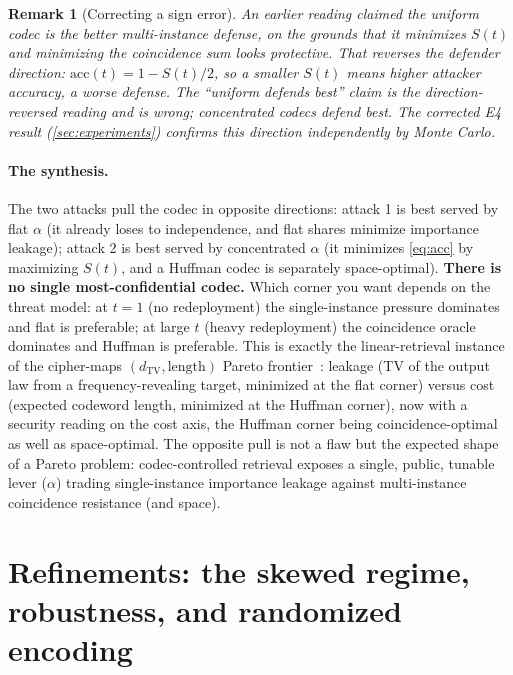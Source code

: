 \documentclass[sigconf,nonacm,anonymous,balance=false]{acmart}
\newtheorem{remark}{Remark}
\newcommand{\TV}{d_{\mathrm{TV}}}
\newcommand{\al}{\alpha}                    %
\begin{document}
\begin{remark}[Correcting a sign error]
\label{rem:sign}
An earlier reading claimed the uniform codec is the \emph{better} multi-instance defense,
on the grounds that it minimizes $S(t)$ and minimizing the coincidence sum looks
protective. That reverses the defender direction: $\mathrm{acc}(t) = 1 - S(t)/2$, so a
\emph{smaller} $S(t)$ means \emph{higher} attacker accuracy, a worse defense. The ``uniform
defends best'' claim is the direction-reversed reading and is wrong; concentrated codecs
defend best. The corrected E4 result (\cref{sec:experiments}) confirms this direction
independently by Monte Carlo.
\end{remark}

\paragraph{The synthesis.}
The two attacks pull the codec in opposite directions: attack 1 is best served by flat
$\al$ (it already loses to independence, and flat shares minimize importance leakage);
attack 2 is best served by concentrated $\al$ (it minimizes \eqref{eq:acc} by maximizing
$S(t)$, and a Huffman codec is separately space-optimal). \textbf{There is no single
most-confidential codec.} Which corner you want depends on the threat model: at $t = 1$
(no redeployment) the single-instance pressure dominates and flat is preferable; at large
$t$ (heavy redeployment) the coincidence oracle dominates and Huffman is preferable. This
is exactly the linear-retrieval instance of the cipher-maps $(\TV, \text{length})$ Pareto
frontier~\cite{towell2026ciphermaps}: leakage (TV of the output law from a
frequency-revealing target, minimized at the flat corner) versus cost (expected codeword
length, minimized at the Huffman corner), now with a security reading on the cost axis,
the Huffman corner being coincidence-optimal as well as space-optimal. The opposite pull is
not a flaw but the expected shape of a Pareto problem: codec-controlled retrieval exposes a
single, public, tunable lever ($\al$) trading single-instance importance leakage against
multi-instance coincidence resistance (and space).

\section{Refinements: the skewed regime, robustness, and randomized encoding}
\label{sec:refinements}
\end{document}
